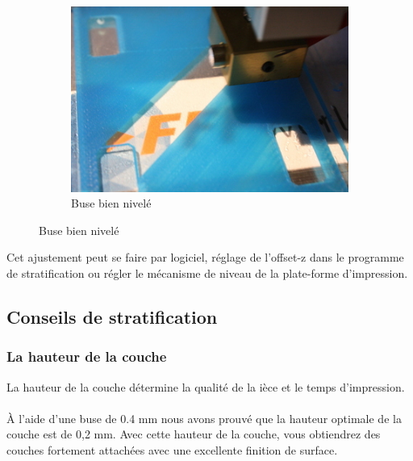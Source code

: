 \documentclass[11pt,a4paper]{article}
\begin{document}
\begin{figure}[H]
\begin{subfigure}[b]{0.3\textwidth}
        \includegraphics[width=\textwidth,cfbox=azul_marcos 3pt 0pt]{FOTOS/HOTENDPERFECTO}
	\caption*{Buse bien nivelé}
    \end{subfigure}
\end{figure}
Cet ajustement peut se faire par logiciel, réglage de l’offset-z dans le programme de stratification ou régler le mécanisme de niveau de la plate-forme d’impression.
	\subsection{Conseils de stratification}
		\subsubsection{La hauteur de la couche}
La hauteur de la couche détermine la qualité de la ièce et le temps d’impression.
\\\\
À l’aide d’une buse de 0.4 mm nous avons prouvé que la hauteur optimale de la couche est de 0,2 mm. Avec cette hauteur de la couche, vous obtiendrez des couches fortement attachées avec une excellente finition de surface.
\end{document}
